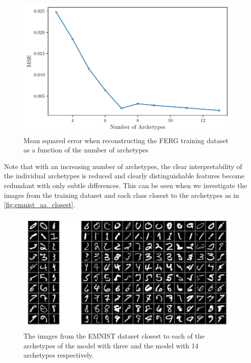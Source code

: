 \begin{figure}[htpb]
	\centering
	\includegraphics{figures/samples/aa_mse_FERG.pdf}
	\caption{Mean squared error when reconstructing the FERG training
		dataset as a function of the number of archetypes}%
	\label{fig:ferg_aa_mse}
\end{figure}

Note that with an increasing number of archetypes, the
clear interpretability of the individual archetypes is reduced and clearly
distinguishable features become redundant with only subtle differences. This
can be seen when we investigate the images from the training dataset and each
class closest to the archetypes as in \autoref{fig:emnist_aa_closest}.

\begin{figure}[htpb]
	\centering
	\includegraphics{figures/samples/archetypes_emnist.pdf}
	\caption{The images from the EMNIST dataset closest to each of the
		archetypes of the model with three and the model with 14 archetypes
		respectively.}%
	\label{fig:emnist_aa_closest}
\end{figure}

